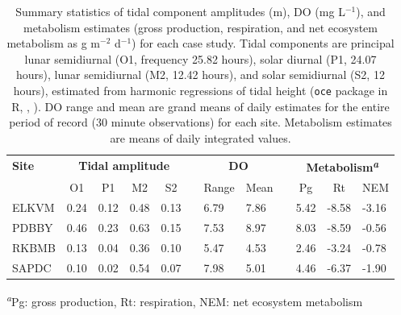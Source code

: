\documentclass[letterpaper,12pt,oneside]{article}\usepackage[]{graphicx}\usepackage[]{color}
\begin{document}
%
\begin{table}[!tbp]
\caption{Summary statistics of tidal component amplitudes (m), \ac{DO} (mg L$^{-1}$), and metabolism estimates (gross production, respiration, and net ecosystem metabolism as g m$^{-2}$ d$^{-1}$) for each case study.  Tidal components are principal lunar semidiurnal (O1, frequency 25.82 hours), solar diurnal (P1, 24.07 hours), lunar semidiurnal (M2, 12.42 hours), and solar semidiurnal (S2, 12 hours), estimated from harmonic regressions of tidal height (\texttt{oce} package in R, \citealt{Foreman89}, ).  \ac{DO} range and mean are grand means of daily estimates for the entire period of record (30 minute observations) for each site.  Metabolism estimates are means of daily integrated values.\label{tab:case_att}} 
\begin{center}
\begin{tabular}{lllllcllclll}
\hline\hline
\multicolumn{1}{l}{\bfseries Site}&\multicolumn{4}{c}{\bfseries Tidal amplitude}&\multicolumn{1}{c}{\bfseries }&\multicolumn{2}{c}{\bfseries DO}&\multicolumn{1}{c}{\bfseries }&\multicolumn{3}{c}{\bfseries Metabolism\textsuperscript{\textit{a}}}\tabularnewline
\cline{2-5} \cline{7-8} \cline{10-12}
\multicolumn{1}{l}{}&\multicolumn{1}{c}{O1}&\multicolumn{1}{c}{P1}&\multicolumn{1}{c}{M2}&\multicolumn{1}{c}{S2}&\multicolumn{1}{c}{}&\multicolumn{1}{c}{Range}&\multicolumn{1}{c}{Mean}&\multicolumn{1}{c}{}&\multicolumn{1}{c}{Pg}&\multicolumn{1}{c}{Rt}&\multicolumn{1}{c}{NEM}\tabularnewline
\hline
ELKVM&0.24&0.12&0.48&0.13&&6.79&7.86&&5.42&-8.58&-3.16\tabularnewline
PDBBY&0.46&0.23&0.63&0.15&&7.53&8.97&&8.03&-8.59&-0.56\tabularnewline
RKBMB&0.13&0.04&0.36&0.10&&5.47&4.53&&2.46&-3.24&-0.78\tabularnewline
SAPDC&0.10&0.02&0.54&0.07&&7.98&5.01&&4.46&-6.37&-1.90\tabularnewline
\hline
\end{tabular}
\end{center}
\footnotesize\textsuperscript{\textit{a}}Pg: gross production, Rt: respiration, NEM: net ecosystem metabolism\end{table}
\end{document}
